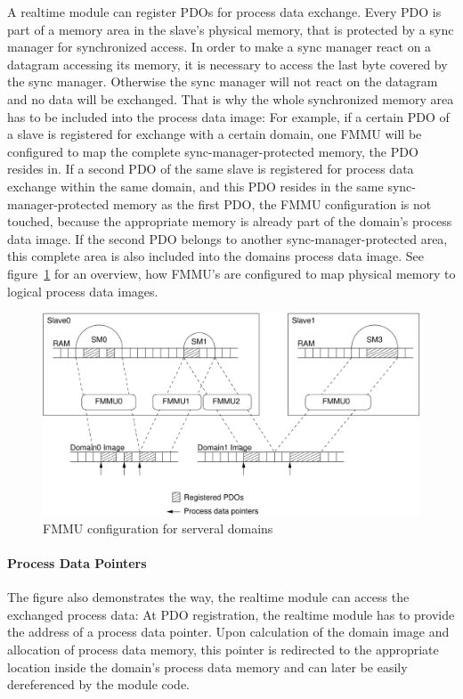 \documentclass[a4paper,12pt,BCOR6mm,bibtotoc,idxtotoc]{scrbook}
\begin{document}
A realtime module can register PDOs for process data exchange. Every
PDO is part of a memory area in the slave's physical memory, that is
protected by a sync manager \cite[section~6.7]{dlspec} for
synchronized access. In order to make a sync manager react on a
datagram accessing its memory, it is necessary to access the last byte
covered by the sync manager. Otherwise the sync manager will not react
on the datagram and no data will be exchanged. That is why the whole
synchronized memory area has to be included into the process data
image: For example, if a certain PDO of a slave is registered for
exchange with a certain domain, one FMMU will be configured to map the
complete sync-manager-protected memory, the PDO resides in. If a
second PDO of the same slave is registered for process data exchange
within the same domain, and this PDO resides in the same
sync-manager-protected memory as the first PDO, the FMMU configuration
is not touched, because the appropriate memory is already part of the
domain's process data image.  If the second PDO belongs to another
sync-manager-protected area, this complete area is also included into
the domains process data image. See figure~\ref{fig:fmmus} for an
overview, how FMMU's are configured to map physical memory to logical
process data images.

\begin{figure}[htbp]
  \centering
  \includegraphics[width=\textwidth]{images/fmmus}
  \caption{FMMU configuration for serveral domains}
  \label{fig:fmmus}
\end{figure}

\paragraph{Process Data Pointers}

The figure also demonstrates the way, the realtime module can access the
exchanged process data: At PDO registration, the realtime module has
to provide the address of a process data pointer. Upon calculation of
the domain image and allocation of process data memory, this pointer
is redirected to the appropriate location inside the domain's process
data memory and can later be easily dereferenced by the module code.
\end{document}
